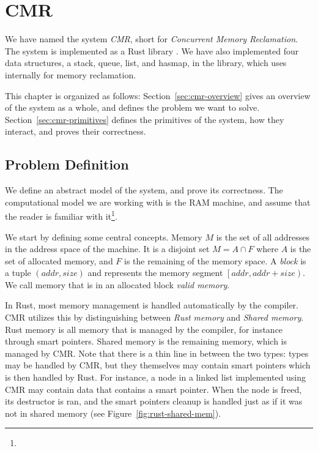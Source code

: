 \chapter{CMR}

We have named the system \emph{CMR}, short for \emph{Concurrent Memory Reclamation}. The system is
implemented as a Rust library . We have also implemented four data structures, a stack,
queue, list, and hasmap, in the  library, which uses 
internally for memory reclamation.

This chapter is organized as follows:
Section~\ref{sec:cmr-overview} gives an overview of the system as a whole, and defines the problem
we want to solve.
Section~\ref{sec:cmr-primitives} defines the primitives of the system, how they interact, and
proves their correctness.

\section{Problem Definition}

We define an abstract model of the system, and prove its correctness.
The computational model we are working with is the RAM machine, and assume that
the reader is familiar with it\footnote{}.

We start by defining some central concepts.
Memory $M$ is the set of all addresses in the address space of the machine.
It is a disjoint set $M = A \cap F$ where $A$ is the set of allocated memory, and $F$ is the
remaining of the memory space.
A \emph{block} is a tuple $(addr, size)$ and represents the memory segment $\left[addr, addr +
size\right)$.
We call memory that is in an allocated block \emph{valid memory}.

In Rust, most memory management is handled automatically by the compiler. CMR utilizes this by
distinguishing between \emph{Rust memory} and \emph{Shared memory}. Rust memory is all memory that
is managed by the compiler, for instance through smart pointers. Shared memory is the remaining
memory, which is managed by CMR\@. Note that there is a thin line in between the two types: types may
be handled by CMR, but they themselves may contain smart pointers which is then handled by Rust.
For instance, a node in a linked list implemented using CMR may contain data that contains a smart
pointer. When the node is freed, its destructor is ran, and the smart pointers cleanup is handled
just as if it was not in shared memory (see Figure~\ref{fig:rust-shared-mem}).

